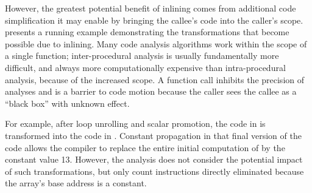 However, the greatest potential benefit of inlining comes from
additional code simplification it may enable by bringing the callee's
code into the caller's scope.  presents a
running example demonstrating the transformations that become possible
due to inlining.  Many code analysis algorithms work within the scope
of a single function; inter-procedural analysis is usually
fundamentally more difficult, and always more computationally
expensive than intra-procedural analysis, because of the increased
scope.  A function call inhibits the precision of analyses and is a
barrier to code motion because the caller sees the callee as a ``black
box'' with unknown effect.



  For example, after loop unrolling and scalar promotion,
the code in  is transformed into the code in
.  Constant propagation in that final version of
the code allows the compiler to replace the entire initial computation
of  by the constant value 13.  However, the analysis does
not consider the potential impact of such transformations, but only
count instructions directly eliminated because the array's base
address is a constant.

